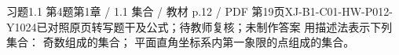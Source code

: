 \par\noindent\begin{minipage}{\linewidth}
\begin{bankitem}{习题1.1 第4题}{第1章 / 1.1 集合 / 教材 p.12 / PDF 第19页}{XJ-B1-C01-HW-P012-Y1024}{已对照原页转写题干及公式；待教师复核；未制作答案}
用描述法表示下列集合：
奇数组成的集合；
平面直角坐标系内第一象限的点组成的集合。
\end{bankitem}
\end{minipage}\par\medskip
